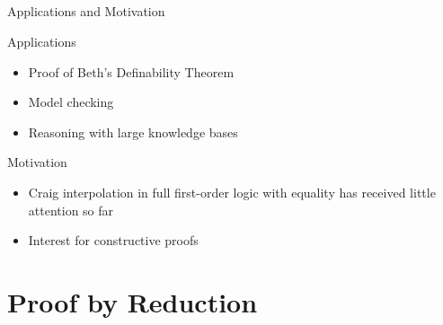 \documentclass[final,compress]{beamer}
\begin{document}
\subsection{}
\begin{frame}{Applications and Motivation}
	\begin{block}{Applications}
		\begin{itemize}
			\item Proof of Beth's Definability Theorem
			\item Model checking
			\item Reasoning with large knowledge bases
		\end{itemize}
	\end{block}
	\pause
	\begin{block}{Motivation}
		\begin{itemize}
			\item Craig interpolation in full first-order logic with equality has received little attention so far
			\item Interest for constructive proofs 
		\end{itemize}
	\end{block}

\end{frame}



\section{Proof by Reduction}
\end{document}

